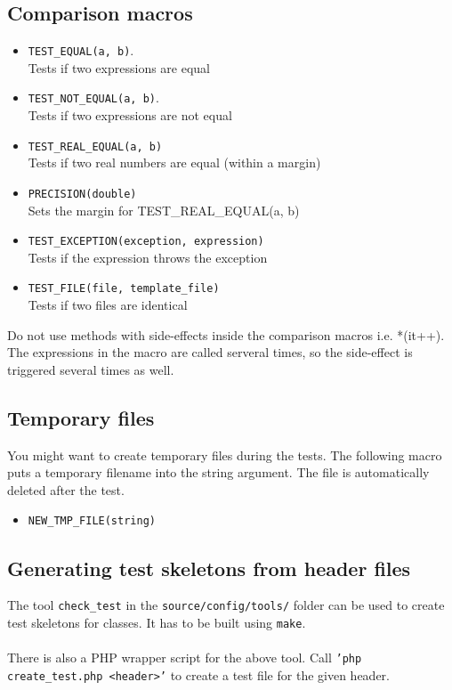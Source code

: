 \documentclass[a4]{article}
\begin{document}
\subsection{Comparison macros}
\begin{itemize}
        \item {\tt TEST\_EQUAL(a, b)}.\\ Tests if two expressions are equal
        \item {\tt TEST\_NOT\_EQUAL(a, b)}.\\ Tests if two expressions are not equal
        \item {\tt TEST\_REAL\_EQUAL(a, b)} \\ Tests if two real numbers are equal (within a margin)
        \item {\tt PRECISION(double)} \\ Sets the margin for TEST\_REAL\_EQUAL(a, b)
        \item {\tt TEST\_EXCEPTION(exception, expression)} \\ Tests if the expression throws the exception
        \item {\tt TEST\_FILE(file, template\_file)} \\ Tests if two files are identical
\end{itemize}
Do not use methods with side-effects inside the comparison macros i.e. *(it++). The expressions
in the macro are called serveral times, so the side-effect is triggered several times as well. 

\subsection{Temporary files}
You might want to create temporary files during the tests. The following macro 
puts a temporary filename into the string argument. The file is automatically deleted
after the test.
\begin{itemize}
        \item {\tt NEW\_TMP\_FILE(string)}
\end{itemize}

\subsection{Generating test skeletons from header files}
The tool {\tt check\_test} in the {\tt source/config/tools/} folder can be used to
create test skeletons for classes. It has to be built using {\tt make}.\\
\\
There is also a PHP wrapper script for the above tool. Call {\tt 'php create\_test.php <header>'}
to create a test file for the given header.
\end{document}
